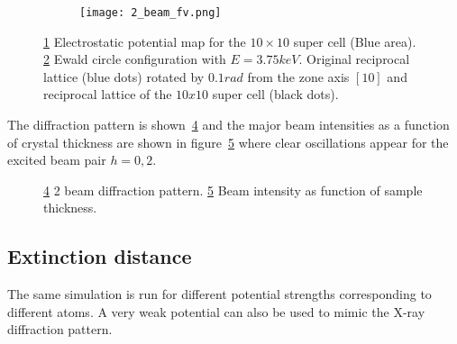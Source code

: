 \documentclass[a4paper,10pt]{article}
\begin{document}
\begin{figure}[h!]
	\begin{subfigure}{0.45\textwidth}
		\centering
		\texttt{[image: 2\_beam\_fv.png]}
		\caption{}\label{fig:2_beam_V}
	\end{subfigure}
	\begin{subfigure}{0.45\textwidth}
		\centering
    \def\svgwidth{\columnwidth}
		
		\caption{}\label{fig:2_beam_E}
	\end{subfigure}

	\caption[2-beam configuration]{
		\ref{fig:2_beam_V} Electrostatic potential map for the $10\times10$ super cell (Blue area).
		\ref{fig:2_beam_E} Ewald circle configuration with $E=3.75keV$. Original reciprocal lattice (blue dots) rotated by $0.1rad$ from the zone axis $[1 0]$ and reciprocal lattice of the $10x10$ super cell (black dots).
	}\label{fig:2_beam_config}
\end{figure}


The diffraction pattern is shown~\ref{fig:2_beam_P} and the major beam intensities as a function of crystal thickness are shown in figure~\ref{fig:2_beam_B} where clear oscillations appear for the excited beam pair $h=0,2$.

\begin{figure}[h!]
  \begin{subfigure}{0.45\textwidth}
    \centering
    \def\svgwidth{\columnwidth}
    
    \caption{}\label{fig:2_beam_P}
  \end{subfigure}
  \begin{subfigure}{0.45\textwidth}
    \centering
    \def\svgwidth{\columnwidth}
    
    \caption{}\label{fig:2_beam_B}
  \end{subfigure}
\caption[2-beam diffraction]{
  \ref{fig:2_beam_P} 2 beam diffraction pattern.
  \ref{fig:2_beam_B} Beam intensity as function of sample thickness.
}\label{fig:2_beam_diff}
\end{figure}



\subsection{Extinction distance}

The same simulation is run for different potential strengths corresponding to different atoms. A very weak potential can also be used to mimic the X-ray diffraction pattern.
\end{document}
